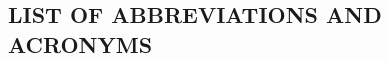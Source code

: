 \renewcommand*\contentsname{\centering TABLE OF CONTENTS}
\tableofcontents


\begin{center}
\section*{LIST OF ABBREVIATIONS AND ACRONYMS}
\end{center}

